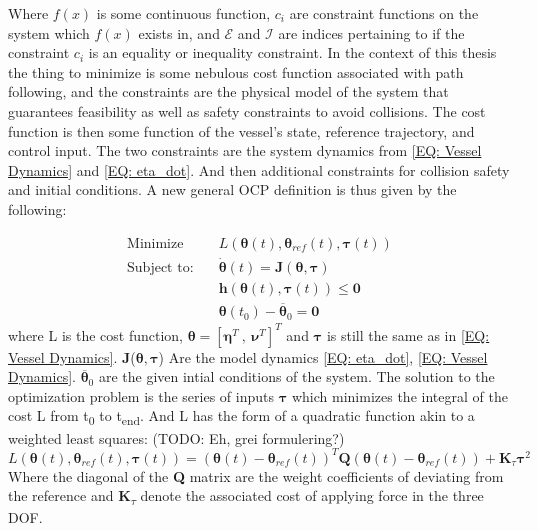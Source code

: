 Where $f(x)$ is some continuous function, $c_i$ are constraint functions on the system which $f(x)$ exists in, and $\mathcal{E}$ and $\mathcal{I}$ are indices
pertaining to if the constraint $c_i$ is an equality or inequality constraint. In the context of this thesis the thing to minimize is some nebulous cost function
associated with path following, and the constraints are the physical model of the system that guarantees feasibility as well as safety constraints to avoid collisions.
The cost function is then some function of the vessel's state, reference trajectory, and control input. The two constraints are the system dynamics from \eqref{EQ: Vessel Dynamics}
and \eqref{EQ: eta_dot}. And then additional constraints for collision safety and initial conditions. A new general \gls{OCP} definition is thus given by the following:

\begin{subequations}
    \label{EQ :OCP description}
\begin{align}
    \textrm{Minimize} \quad & {L}(\bm{\theta}(t), \bm{\theta}_{ref}(t), \bm{\tau}(t)) \\
    \textrm{Subject to:} \quad & \dot{\bm{\theta}}(t) = \textbf{J}(\bm{\theta}, \bm{\tau}) \\
                         \quad & \textbf{h}(\bm{\theta}(t), \bm{\tau}(t)) \leq \bm{0} \\
                         \quad & \bm{\theta}(t_0) - \overline{\bm{\theta}}_0 = \bm{0}
\end{align}
\end{subequations}
where L is the cost function, $\bm{\theta} = [\bm{\eta}^T \ , \ \bm{\nu}^T]^T$ and $\bm{\tau}$ is still the same as in \eqref{EQ: Vessel Dynamics}. 
\textbf{J}($\bm{\theta}, \bm{\tau}$) Are the model dynamics \eqref{EQ: eta_dot}, \eqref{EQ: Vessel Dynamics}. $\overline{\bm{\theta}}_0$ are the
given intial conditions of the system.
The solution to the optimization problem is the series of inputs $\bm{\tau}$ which minimizes the integral of the cost L 
from t\textsubscript{0} to t\textsubscript{end}. And L has the form of a quadratic function
akin to a weighted least squares: (TODO: Eh, grei formulering?)
\begin{equation}
    L(\bm{\theta}(t), \bm{\theta}_{ref}(t), \bm{\tau}(t)) = (\bm{\theta}(t) - \bm{\theta}_{ref}(t))^T \textbf{Q} (\bm{\theta}(t) - \bm{\theta}_{ref}(t)) + \textbf{K}_\tau \bm{\tau}^2
\end{equation}
Where the diagonal of the \textbf{Q} matrix are the weight coefficients of deviating from the reference
and \textbf{K}\textsubscript{$\tau$} denote the associated cost of applying force in the three \gls{DOF}.

